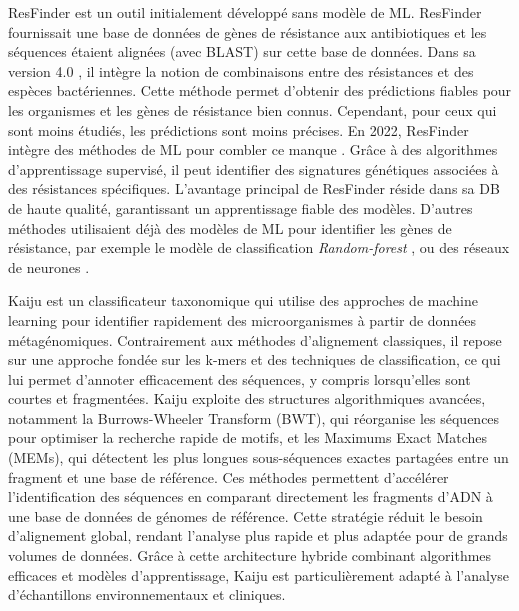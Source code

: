 ResFinder\cite{zankari_identification_2012} est un outil initialement développé sans modèle de ML. ResFinder fournissait une base de données de gènes de résistance aux antibiotiques et les séquences étaient alignées (avec BLAST) sur cette base de données. Dans sa version 4.0 \cite{bortolaia_resfinder_2020}, il intègre la notion de combinaisons entre des résistances et des espèces bactériennes. Cette méthode permet d'obtenir des prédictions fiables pour les organismes et les gènes de résistance bien connus. Cependant, pour ceux qui sont moins étudiés, les prédictions sont moins précises. En 2022, ResFinder intègre des méthodes de ML pour combler ce manque \cite{florensa_resfinder_2022}. Grâce à des algorithmes d’apprentissage supervisé, il peut identifier des signatures génétiques associées à des résistances spécifiques. L’avantage principal de ResFinder réside dans sa DB de haute qualité, garantissant un apprentissage fiable des modèles. D'autres méthodes utilisaient déjà des modèles de ML pour identifier les gènes de résistance, par exemple le modèle de classification \textit{Random-forest} \cite{aytan-aktug_predicting_2021}, ou des réseaux de neurones \cite{aytan-aktug_prediction_2020}.


Kaiju \cite{menzel_fast_2016} est un classificateur taxonomique qui utilise des approches de machine learning pour identifier rapidement des microorganismes à partir de données métagénomiques. Contrairement aux méthodes d’alignement classiques, il repose sur une approche fondée sur les k-mers et des techniques de classification, ce qui lui permet d’annoter efficacement des séquences, y compris lorsqu’elles sont courtes et fragmentées. Kaiju exploite des structures algorithmiques avancées, notamment la Burrows-Wheeler Transform (BWT), qui réorganise les séquences pour optimiser la recherche rapide de motifs, et les Maximums Exact Matches (MEMs), qui détectent les plus longues sous-séquences exactes partagées entre un fragment et une base de référence. Ces méthodes permettent d’accélérer l’identification des séquences en comparant directement les fragments d’ADN à une base de données de génomes de référence. Cette stratégie réduit le besoin d’alignement global, rendant l’analyse plus rapide et plus adaptée pour de grands volumes de données. Grâce à cette architecture hybride combinant algorithmes efficaces et modèles d’apprentissage, Kaiju est particulièrement adapté à l’analyse d’échantillons environnementaux et cliniques.


